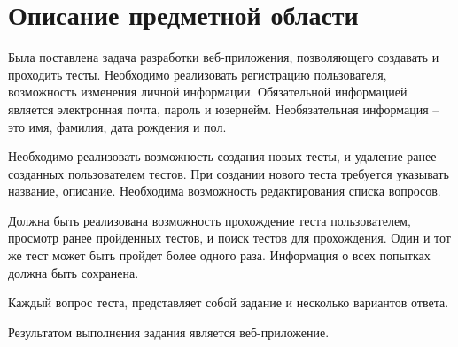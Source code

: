 \section{ Описание предметной области }

Была поставлена задача разработки веб-приложения, позволяющего создавать и проходить тесты. Необходимо реализовать регистрацию пользователя, возможность изменения личной информации. Обязательной информацией является электронная почта, пароль и юзернейм. Необязательная информация -- это имя, фамилия, дата рождения и пол.

Необходимо реализовать возможность создания новых тесты, и удаление ранее созданных пользователем тестов. При создании нового теста требуется указывать название, описание. Необходима возможность редактирования списка вопросов.

Должна быть реализована возможность прохождение теста пользователем, просмотр ранее пройденных тестов, и поиск тестов для прохождения. Один и тот же тест может быть пройдет более одного раза. Информация о всех попытках должна быть сохранена.

Каждый вопрос теста, представляет собой задание и несколько вариантов ответа.

Результатом выполнения задания является веб-приложение.




